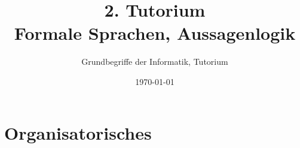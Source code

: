 




\title[Formale Sprachen, Aussagenlogik]{2. Tutorium\\ Formale Sprachen, Aussagenlogik}
\subtitle{Grundbegriffe der Informatik, Tutorium \hashtag\mytutnumber}
\date{\today}


\titleframe
\roadmap

\section{Organisatorisches}

\Kilian{}

